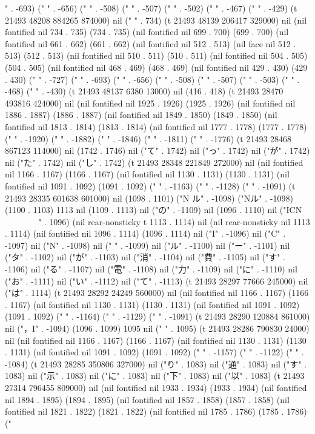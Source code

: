 " . -693) ("
" . -656) ("
" . -508) ("
" . -507) ("
" . -502) ("
" . -467) ("
" . -429) (t 21493 48208 884265 874000) nil ("
" . 734) (t 21493 48139 206417 329000) nil (nil fontified nil 734 . 735) (734 . 735) (nil fontified nil 699 . 700) (699 . 700) (nil fontified nil 661 . 662) (661 . 662) (nil fontified nil 512 . 513) (nil face nil 512 . 513) (512 . 513) (nil fontified nil 510 . 511) (510 . 511) (nil fontified nil 504 . 505) (504 . 505) (nil fontified nil 468 . 469) (468 . 469) (nil fontified nil 429 . 430) (429 . 430) ("
" . -727) ("
" . -693) ("
" . -656) ("
" . -508) ("
" . -507) ("
" . -503) ("
" . -468) ("
" . -430) (t 21493 48137 6380 13000) nil (416 . 418) (t 21493 28470 493816 424000) nil (nil fontified nil 1925 . 1926) (1925 . 1926) (nil fontified nil 1886 . 1887) (1886 . 1887) (nil fontified nil 1849 . 1850) (1849 . 1850) (nil fontified nil 1813 . 1814) (1813 . 1814) (nil fontified nil 1777 . 1778) (1777 . 1778) ("
" . -1920) ("
" . -1882) ("
" . -1846) ("
" . -1811) ("
" . -1776) (t 21493 28468 867123 114000) nil (1742 . 1746) nil ("て" . 1742) nil ("っ" . 1742) nil ("が" . 1742) nil ("た" . 1742) nil ("し" . 1742) (t 21493 28348 221849 272000) nil (nil fontified nil 1166 . 1167) (1166 . 1167) (nil fontified nil 1130 . 1131) (1130 . 1131) (nil fontified nil 1091 . 1092) (1091 . 1092) ("
" . -1163) ("
" . -1128) ("
" . -1091) (t 21493 28335 601638 601000) nil (1098 . 1101) ("N ル" . -1098) ("Nル" . -1098) (1100 . 1103) 1113 nil (1109 . 1113) nil ("の" . -1109) nil (1096 . 1110) nil ("ICN 􀏧􀊔􀎻􀍰􀦫􀶅􀍞􀎕􀎔􀰿􀾗􀍷􀍏􀍪" . 1096) (nil rear-nonsticky t 1113 . 1114) nil (nil rear-nonsticky nil 1113 . 1114) (nil fontified nil 1096 . 1114) (1096 . 1114) nil ("I" . -1096) nil ("C" . -1097) nil ("N" . -1098) nil (" " . -1099) nil ("ル" . -1100) nil ("ー" . -1101) nil ("タ" . -1102) nil ("が" . -1103) nil ("消" . -1104) nil ("費" . -1105) nil ("す" . -1106) nil ("る" . -1107) nil ("電" . -1108) nil ("力" . -1109) nil ("に" . -1110) nil ("お" . -1111) nil ("い" . -1112) nil ("て" . -1113) (t 21493 28297 77666 245000) nil ("は" . 1114) (t 21493 28292 24249 560000) nil (nil fontified nil 1166 . 1167) (1166 . 1167) (nil fontified nil 1130 . 1131) (1130 . 1131) (nil fontified nil 1091 . 1092) (1091 . 1092) ("
" . -1164) ("
" . -1129) ("
" . -1091) (t 21493 28290 120884 861000) nil ("，I" . -1094) (1096 . 1099) 1095 nil (" " . 1095) (t 21493 28286 790830 24000) nil (nil fontified nil 1166 . 1167) (1166 . 1167) (nil fontified nil 1130 . 1131) (1130 . 1131) (nil fontified nil 1091 . 1092) (1091 . 1092) ("
" . -1157) ("
" . -1122) ("
" . -1084) (t 21493 28285 350806 327000) nil ("り" . 1083) nil ("通" . 1083) nil ("す" . 1083) nil ("示" . 1083) nil ("に" . 1083) nil ("下" . 1083) nil ("以" . 1083) (t 21493 27314 796455 809000) nil (nil fontified nil 1933 . 1934) (1933 . 1934) (nil fontified nil 1894 . 1895) (1894 . 1895) (nil fontified nil 1857 . 1858) (1857 . 1858) (nil fontified nil 1821 . 1822) (1821 . 1822) (nil fontified nil 1785 . 1786) (1785 . 1786) ("
